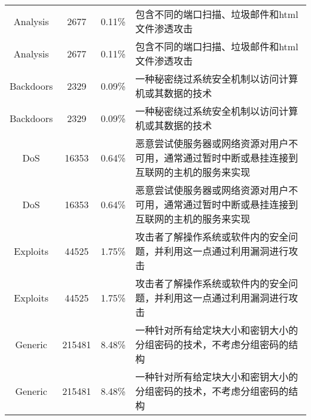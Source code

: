 \begin{table}[h]
\begin{tabularx}{\textwidth}{@{}cccX@{}}
		Analysis                          & 2677                              & 0.11\%                                  & 包含不同的端口扫描、垃圾邮件和html文件渗透攻击                                                   \\
		Analysis                          & 2677                              & 0.11\%                                  & 包含不同的端口扫描、垃圾邮件和html文件渗透攻击                                                   \\

		Backdoors                         & 2329                              & 0.09\%                                  & 一种秘密绕过系统安全机制以访问计算机或其数据的技术                                               \\
		Backdoors                         & 2329                              & 0.09\%                                  & 一种秘密绕过系统安全机制以访问计算机或其数据的技术                                               \\

		DoS                               & 16353                             & 0.64\%                                  & 恶意尝试使服务器或网络资源对用户不可用，通常通过暂时中断或悬挂连接到互联网的主机的服务来实现     \\
		DoS                               & 16353                             & 0.64\%                                  & 恶意尝试使服务器或网络资源对用户不可用，通常通过暂时中断或悬挂连接到互联网的主机的服务来实现     \\

		Exploits                          & 44525                             & 1.75\%                                  & 攻击者了解操作系统或软件内的安全问题，并利用这一点通过利用漏洞进行攻击                           \\
		Exploits                          & 44525                             & 1.75\%                                  & 攻击者了解操作系统或软件内的安全问题，并利用这一点通过利用漏洞进行攻击                           \\

		Generic                           & 215481                            & 8.48\%                                  & 一种针对所有给定块大小和密钥大小的分组密码的技术，不考虑分组密码的结构                           \\
		Generic                           & 215481                            & 8.48\%                                  & 一种针对所有给定块大小和密钥大小的分组密码的技术，不考虑分组密码的结构                           \\


\end{tabularx}
\end{table}
